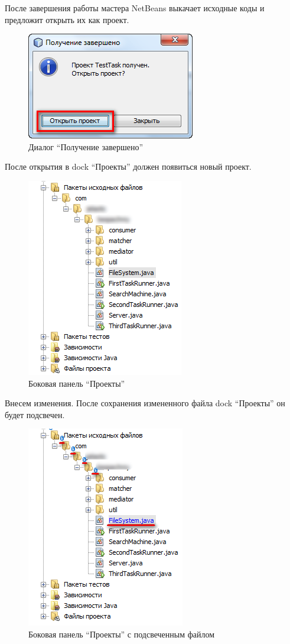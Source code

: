 \documentclass[a4paper,12pt]{article}
\begin{document}
После завершения работы мастера NetBeans выкачает исходные коды и
предложит открыть их как проект.

\begin{figure}[h!]
	\centering
	\includegraphics[scale=0.80]{netbeans-checkout-4.png}
	\vspace{-10pt}
	\caption{Диалог ``Получение завершено''}
\end{figure}

После открытия в dock ``Проекты'' должен появиться новый проект.

\begin{figure}[h!]
	\centering
	\includegraphics[scale=0.85]{netbeans-1.png}
	\caption{Боковая панель ``Проекты''}
\end{figure}

Внесем изменения. После сохранения измененного файла dock ``Проекты'' он
будет подсвечен.

\begin{figure}[h!]
	\centering
	\includegraphics[scale=0.85]{netbeans-2.png}
	\caption{Боковая панель ``Проекты'' с подсвеченным файлом}
\end{figure}
\end{document}
